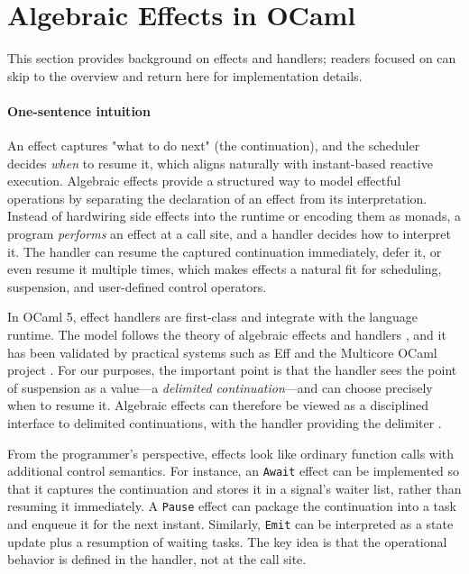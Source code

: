\section{Algebraic Effects in OCaml}
This section provides background on effects and handlers; readers focused on
\tempo{} can skip to the overview and return here for implementation details.

\paragraph{One-sentence intuition}
An effect captures "what to do next" (the continuation), and the scheduler
decides \emph{when} to resume it, which aligns naturally with instant-based
reactive execution.
Algebraic effects provide a structured way to model effectful operations by
separating the declaration of an effect from its interpretation. Instead of
hardwiring side effects into the runtime or encoding them as monads, a program
\emph{performs} an effect at a call site, and a handler decides how to interpret
it. The handler can resume the captured continuation immediately, defer it, or
even resume it multiple times, which makes effects a natural fit for
scheduling, suspension, and user-defined control operators.

In OCaml 5, effect handlers are first-class and integrate with the language
runtime. The model follows the theory of algebraic effects and handlers
\cite{plotkinpretnar2009}, and it has been validated by practical systems such
as Eff \cite{eff2013} and the Multicore OCaml project
\cite{multicoreocaml2020}. For our purposes, the important point is that the
handler sees the point of suspension as a value---a \emph{delimited
continuation}---and can choose precisely when to resume it. Algebraic effects
can therefore be viewed as a disciplined interface to delimited continuations,
with the handler providing the delimiter \cite{danvyfilinski1990,filinski1994}.

From the programmer's perspective, effects look like ordinary function calls
with additional control semantics. For instance, an \texttt{Await} effect can be
implemented so that it captures the continuation and stores it in a signal's
waiter list, rather than resuming it immediately. A \texttt{Pause} effect can
package the continuation into a task and enqueue it for the next instant.
Similarly, \texttt{Emit} can be interpreted as a state update plus a resumption
of waiting tasks. The key idea is that the operational behavior is defined in
the handler, not at the call site.

